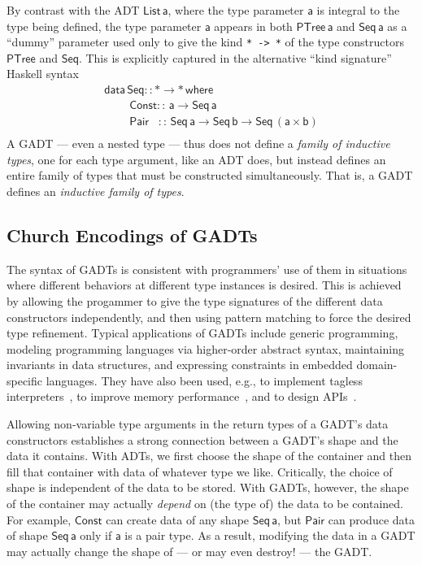 \documentclass[acmsmall,screen,review,anonymous]{acmart}
\theoremstyle{definition}
\begin{document}
By contrast with the ADT $\mathsf{List\, a}$, where the type parameter
$\mathsf{a}$ is integral to the type being defined, the type parameter
$\mathsf{a}$ appears in both $\mathsf{PTree\,a}$ and $\mathsf{Seq\,a}$
as a ``dummy'' parameter used only to give the kind \verb|* -> *| of
the type constructors $\mathsf{PTree}$ and $\mathsf{Seq}$. This is
explicitly captured in the alternative ``kind signature'' Haskell
syntax
\[\begin{array}{l}
\mathsf{data\, Seq :: * \to *\,where}\\
\mathsf{\;\;\;\;\;\;\;\;Const ::\, a \to Seq\,a}\\
\mathsf{\;\;\;\;\;\;\;\;Pair\,\,\,\,\, ::\, Seq \,a \to Seq\,b \to
  Seq\,(a \times b)}\\ 
\end{array}\]
A GADT --- even a nested type --- thus does not define a {\em family
  of inductive types}, one for each type argument, like an ADT does,
but instead defines an entire family of types that must be constructed
simultaneously. That is, a GADT defines an {\em inductive family of
  types}.

\subsection{Church Encodings of GADTs}\label{sec:CEs}

The syntax of GADTs is consistent with programmers' use of them in
situations where different behaviors at different type instances is
desired. This is achieved by allowing the progammer to give the type
signatures of the different data constructors independently, and then
using pattern matching to force the desired type refinement.  Typical
applications of GADTs include generic programming, modeling
programming languages via higher-order abstract syntax, maintaining
invariants in data structures, and expressing constraints in embedded
domain-specific languages. They have also been used, e.g., to
implement tagless interpreters~\cite{pl04,pr06,pvww06}, to improve
memory performance~\cite{min15}, and to design APIs~\cite{pen20}.

Allowing non-variable type arguments in the return types of a GADT's
data constructors establishes a strong connection between a GADT's
shape and the data it contains. With ADTs, we first choose the shape
of the container and then fill that container with data of whatever
type we like. Critically, the choice of shape is independent of the
data to be stored. With GADTs, however, the shape of the container may
actually {\em depend} on (the type of) the data to be contained. For
example, $\mathsf{Const}$ can create data of any shape
$\mathsf{Seq\,a}$, but $\mathsf{Pair}$ can produce data of shape
$\mathsf{Seq\,a}$ only if $\mathsf{a}$ is a pair type. As a result,
modifying the data in a GADT may actually change the shape of --- or
may even destroy! --- the GADT.
\end{document}
